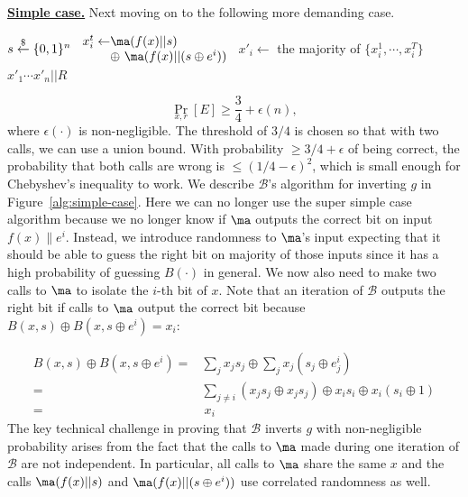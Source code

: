 \bigskip
\noindent\textbf{\underline{Simple case.}}
Next moving on to the following more demanding case.
\begin{marginfigure}
\begin{algorithmic}
		\State $s \stackrel{\$}{\leftarrow} \{0,1\}^{n}$
		\State $\begin{array}{l@{}l}
		x_i^t \leftarrow& \ma(f(x)|| s) \\
		& \oplus~ \ma(f(x) || (s\oplus e^i))
		\end{array}$
	\EndFor
	\State $x'_i \gets $ the majority of $\{x_i^1, \cdots, x_i^T\}$
\EndFor
\State \Return $x'_1\cdots x'_n||R$
\end{algorithmic}
\caption{Simple Case $\mathcal{B}$} \label{alg:simple-case}
\end{marginfigure}
$$\Pr_{x,r}[E] \geq \frac{3}{4} + \epsilon(n),$$ where $\epsilon(\cdot)$ is non-negligible. The threshold of $3/4$ is chosen so that with two calls, we can use a union bound. With probability $\geq 3/4 + \epsilon$ of being correct, the probability that both calls are wrong is $\leq (1/4 - \epsilon)^2$, which is small enough for Chebyshev's inequality to work.
We describe $\mathcal{B}$'s algorithm for inverting $g$ in Figure~\ref{alg:simple-case}.
Here we can no longer use the super simple case algorithm because we no longer know if $\ma$ outputs the correct bit on input $f(x) \| e^i$.
Instead, we introduce randomness to $\ma$'s input expecting that it should be able to guess the right bit on majority of those inputs since it has a high probability of guessing $B(\cdot)$ in general.
We now also need to make two calls to $\ma$ to isolate the $i$-th bit of $x$.
Note that an iteration of $\mathcal{B}$ outputs the right bit if calls to $\ma$ output the correct bit because $B(x,s) \oplus B(x, s\oplus e^i) = x_i$:

\begin{align*}
B(x,s) \oplus B(x, s\oplus e^i) =& \sum_j x_j s_j \oplus \sum_j x_j (s_j \oplus e^i_j)\\
=& \sum_{j \not= i} (x_j s_j \oplus x_j s_j) \oplus x_i s_i \oplus x_i (s_i \oplus 1)\\
=& ~x_i
\end{align*}
The key technical challenge in proving that $\mathcal{B}$ inverts $g$ with non-negligible probability arises from the fact that the calls to $\ma$ made during one iteration of $\mathcal{B}$ are not independent.
In particular, all calls to $\ma$ share the same $x$ and the calls $\ma(f(x)|| s)$ and $\ma(f(x) || (s \oplus e^i))$ use correlated randomness as well.

